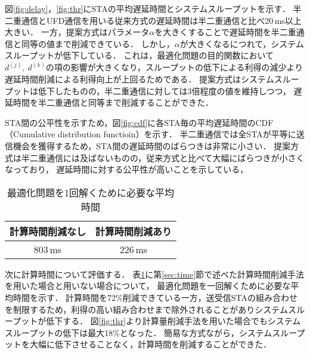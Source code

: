 \documentclass[technicalreport]{ieicej}
\begin{document}
		\par
		図\ref{fig:delay}，\ref{fig:thr}にSTAの平均遅延時間とシステムスループットを示す．
		半二重通信とUFD通信を用いる従来方式の遅延時間は半二重通信と比べ20\,ms以上大きい．
		一方，提案方式はパラメータ$\alpha$を大きくすることで遅延時間を半二重通信と同等の値まで削減できている．
		しかし，$\alpha$が大きくなるにつれて，システムスループットが低下している．
		これは，最適化問題の目的関数において$d^{(j)},\ d^{(k)}$の項の影響が大きくなり，スループットの低下による利得の減少より遅延時間削減による利得向上が上回るためである．
		提案方式はシステムスループットは低下したものの，半二重通信に対しては3倍程度の値を維持しつつ，
		遅延時間を半二重通信と同等まで削減することができた．
		\par
		STA間の公平性を示すため，図\ref{fig:cdf}に各STA毎の平均遅延時間のCDF（Cumulative distribution functioin）を示す．
		半二重通信では全STAが平等に送信機会を獲得するため，STA間の遅延時間のばらつきは非常に小さい．
		提案方式は半二重通信には及ばないものの，従来方式と比べて大幅にばらつきが小さくなっており，
		遅延時間に対する公平性が高いことを示している，

		\begin{table}[t]
			\centering
			\caption{最適化問題を1回解くために必要な平均時間}
			\label{tab:time}
			\begin{tabular}{cc}
			 計算時間削減なし & 計算時間削減あり\\ \hline
			 803\,ms & 226\,ms \\\hline
			\end{tabular}
		\end{table}

	\par
	次に計算時間について評価する．
	表\ref{tab:time}に第\ref{sec:time}節で述べた計算時間削減手法を用いた場合と用いない場合について，
	最適化問題を一回解くために必要な平均時間を示す．
	計算時間を72\%削減できている一方，送受信STAの組み合わせを制限するため，利得の高い組み合わせまで除外されることがありシステムスループットが低下する．
	図\ref{fig:thr}より計算量削減手法を用いた場合でもシステムスループットの低下は最大18\%となった．
	簡易な方式ながら，システムスループットを大幅に低下させることなく，計算時間を削減することができた．
\end{document}
